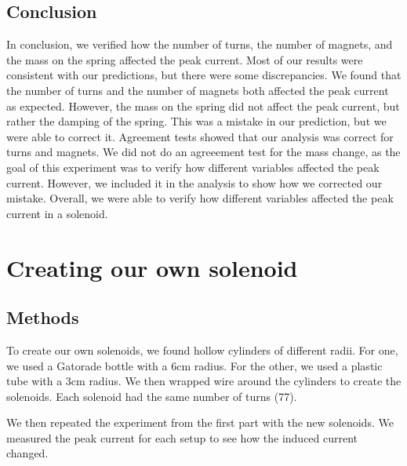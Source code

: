 \documentclass[11pt]{article}
\let\oldsection\section
\renewcommand\section{\clearpage\oldsection}
\begin{document}
    \subsection{Conclusion}\label{subsec:part_1_conclusion}

    In conclusion, we verified how the number of turns, the number of magnets, and the mass on the spring affected the peak current.
    Most of our results were consistent with our predictions, but there were some discrepancies.
    We found that the number of turns and the number of magnets both affected the peak current as expected.
    However, the mass on the spring did not affect the peak current, but rather the damping of the spring.
    This was a mistake in our prediction, but we were able to correct it.
    Agreement tests showed that our analysis was correct for turns and magnets.
    We did not do an agreeement test for the mass change, as the goal of this experiment was to verify how different variables affected the peak current.
    However, we included it in the analysis to show how we corrected our mistake.
    Overall, we were able to verify how different variables affected the peak current in a solenoid.


    \section{Creating our own solenoid}\label{sec:part_2}

    \subsection{Methods}\label{subsec:part_2_methods}

    To create our own solenoids, we found hollow cylinders of different radii.
    For one, we used a Gatorade bottle with a 6cm radius.
    For the other, we used a plastic tube with a 3cm radius.
    We then wrapped wire around the cylinders to create the solenoids.
    Each solenoid had the same number of turns (77).

    We then repeated the experiment from the first part with the new solenoids.
    We measured the peak current for each setup to see how the induced current changed.
\end{document}
